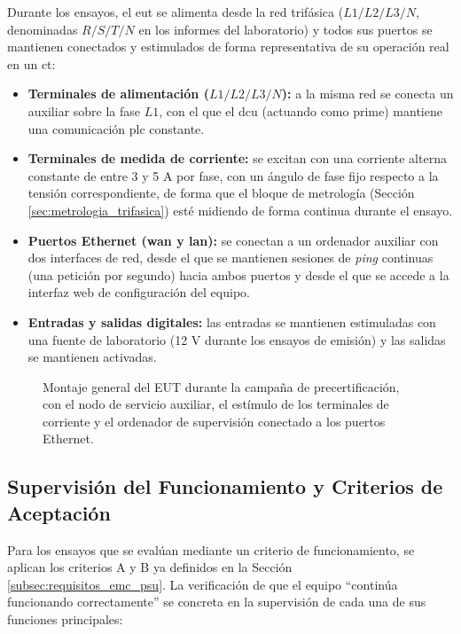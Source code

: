 Durante los ensayos, el \gls{eut} se alimenta desde la red trifásica ($L1/L2/L3/N$, denominadas $R/S/T/N$ en los informes del laboratorio) y todos sus puertos se mantienen conectados y estimulados de forma representativa de su operación real en un \gls{ct}:

\begin{itemize}
    \item \textbf{Terminales de alimentación ($L1/L2/L3/N$):} a la misma red se conecta un  auxiliar sobre la fase $L1$, con el que el \gls{dcu} (actuando como  \gls{prime}) mantiene una comunicación \gls{plc} constante.
    \item \textbf{Terminales de medida de corriente:} se excitan con una corriente alterna constante de entre 3 y 5 A por fase, con un ángulo de fase fijo respecto a la tensión correspondiente, de forma que el bloque de metrología (Sección \ref{sec:metrologia_trifasica}) esté midiendo de forma continua durante el ensayo.
    \item \textbf{Puertos Ethernet (\gls{wan} y \gls{lan}):} se conectan a un ordenador auxiliar con dos interfaces de red, desde el que se mantienen sesiones de \textit{ping} continuas (una petición por segundo) hacia ambos puertos y desde el que se accede a la interfaz web de configuración del equipo.
    \item \textbf{Entradas y salidas digitales:} las entradas se mantienen estimuladas con una fuente de laboratorio (12 V durante los ensayos de emisión) y las salidas se mantienen activadas.
\end{itemize}

\begin{figure}[htbp]
    \centering
    \caption{Montaje general del EUT durante la campaña de precertificación, con el nodo de servicio auxiliar, el estímulo de los terminales de corriente y el ordenador de supervisión conectado a los puertos Ethernet.}
    \label{fig:setup_general_ensayos}
\end{figure}

\subsection{Supervisión del Funcionamiento y Criterios de Aceptación}
\label{subsec:supervision_criterios}

Para los ensayos que se evalúan mediante un criterio de funcionamiento, se aplican los criterios A y B ya definidos en la Sección \ref{subsec:requisitos_emc_psu}. La verificación de que el equipo ``continúa funcionando correctamente'' se concreta en la supervisión de cada una de sus funciones principales:

